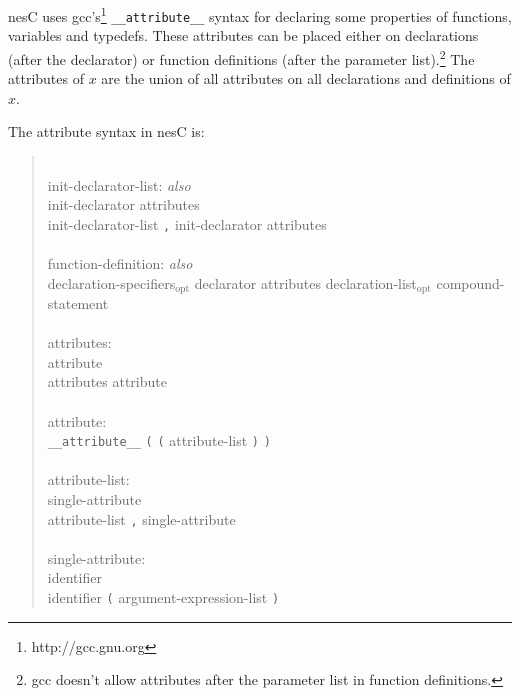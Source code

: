 \documentclass[11pt,letterpaper]{article}
\newcommand{\kw}[1]{{\tt #1}}
\newcommand{\nesc}{nesC\xspace}
\newcommand{\opt}{$_{\mbox{opt}}$\xspace}
\newcommand{\grammarshift}{\vspace*{-.7cm}}
\newcommand{\grammarindent}{\hspace*{2cm}\= \\ \kill}
\begin{document}
\nesc uses gcc's\footnote{http://gcc.gnu.org} \kw{\_\_attribute\_\_} syntax
for declaring some properties of functions, variables and typedefs. These
attributes can be placed either on declarations (after the declarator) or
function definitions (after the parameter list).\footnote{gcc doesn't
allow attributes after the parameter list in function definitions.} The
attributes of $x$ are the union of all attributes on all declarations and
definitions of $x$.

The attribute syntax in \nesc is:
\begin{quote} \grammarshift \em \begin{tabbing}
\grammarindent
init-declarator-list: \emph{also}\\
\>	init-declarator attributes\\
\>	init-declarator-list \kw{,} init-declarator attributes\\
\\
function-definition: \emph{also}\\
\>	declaration-specifiers\opt declarator attributes declaration-list\opt compound-statement\\
\\
attributes:\\
\>	attribute\\
\>	attributes attribute\\
\\
attribute:\\
\>	\kw{\_\_attribute\_\_} \kw{(} \kw{(} attribute-list \kw{)} \kw{)}\\
\\
attribute-list:\\
\>	single-attribute\\
\>	attribute-list \kw{,} single-attribute\\
\\
single-attribute:\\
\>	identifier\\
\>	identifier \kw{(} argument-expression-list \kw{)}\\
\end{tabbing} \end{quote}
\end{document}
